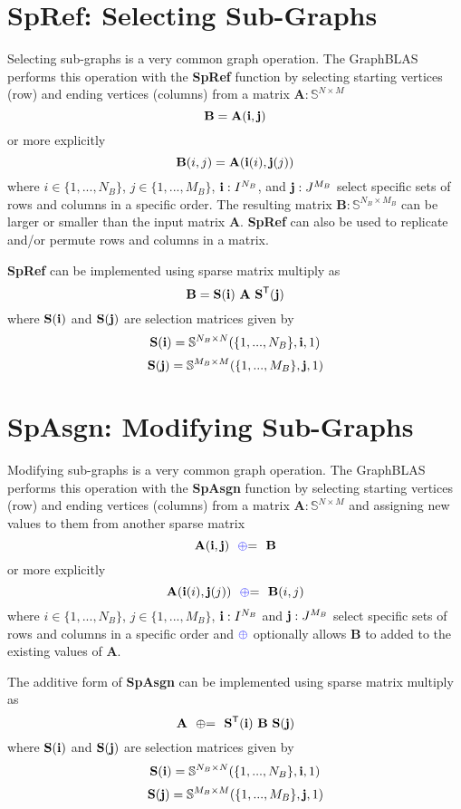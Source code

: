 \section{SpRef: Selecting Sub-Graphs}
  Selecting sub-graphs is a very common graph operation.  The GraphBLAS performs this operation with the {\bf SpRef} function by selecting starting vertices (row) and ending vertices (columns) from a matrix $\mathbf{A} : \mathbb{S}^{N \times M}$
$$
   \mathbf{B}= \mathbf{A}({\bf i},{\bf j})
$$
or more explicitly
$$
   {\bf B}(i,j) = {\bf A}({\bf i}(i),{\bf j}(j))
$$
where $i \in \{1,...,N_B\}$, $j \in \{1,...,M_B\}$, ${\bf i} : I^{N_B}$, and ${\bf j}: J^{M_B}$  select specific sets of rows and columns in a specific order.   The resulting matrix $\mathbf{B} : \mathbb{S}^{N_B \times M_B}$ can be larger or smaller than the input matrix $\mathbf{A}$.  {\bf SpRef} can also be used to replicate and/or permute rows and columns in a matrix.

  {\bf SpRef} can be implemented using sparse matrix multiply as
$$
   \mathbf{B}= \mathbf{S}({\bf i}) ~ \mathbf{A} ~ \mathbf{S}^{\sf T}({\bf j})
$$
where $\mathbf{S}({\bf i})$ and $\mathbf{S}({\bf j})$ are selection matrices given by
$$
   \mathbf{S}({\bf i}) = \mathbb{S}^{N_B \times N}(\{1,...,N_B\},{\bf i},1)
$$
$$
    \mathbf{S}({\bf j}) = \mathbb{S}^{M_B \times M}(\{1,...,M_B\},{\bf j},1)
$$


\section{SpAsgn: Modifying Sub-Graphs}
  Modifying sub-graphs is a very common graph operation.  The GraphBLAS performs this operation with the {\bf SpAsgn} function by selecting starting vertices (row) and ending vertices (columns) from a matrix $\mathbf{A} : \mathbb{S}^{N \times M}$ and assigning new values to them from another sparse matrix
$$
   \mathbf{A}({\bf i},{\bf j}) ~~ {\textcolor{blue}{\oplus}}{=} ~~ \mathbf{B}
$$
or more explicitly
$$
   {\bf A}({\bf i}(i),{\bf j}(j)) ~~ {\textcolor{blue}{\oplus}}{=} ~~{\bf B}(i,j) 
$$
where $i \in \{1,...,N_B\}$, $j \in \{1,...,M_B\}$, ${\bf i} : I^{N_B}$ and ${\bf j}: J^{M_B}$ select specific sets of rows and columns in a specific order and ${\textcolor{blue}{\oplus}}$ optionally allows $\mathbf{B}$ to added to the existing values of $\mathbf{A}$. 

  The additive form of {\bf SpAsgn} can be implemented using sparse matrix multiply as
$$
   \mathbf{A} ~~ {\oplus}{=} ~~ \mathbf{S}^{\sf T}({\bf i}) ~ \mathbf{B} ~ \mathbf{S}({\bf j})
$$
where $\mathbf{S}({\bf i})$ and $\mathbf{S}({\bf j})$ are selection matrices given by
$$
   \mathbf{S}({\bf i}) = \mathbb{S}^{N_B \times N}(\{1,...,N_B\},{\bf i},1)
$$
$$
    \mathbf{S}({\bf j}) = \mathbb{S}^{M_B \times M}(\{1,...,M_B\},{\bf j},1)
$$
  

